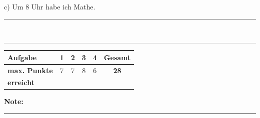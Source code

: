 \documentclass[11pt, a4paper]{article}
\newcommand{\luecke}[1]{\rule{#1}{0.4pt}}
\begin{document}
\noindent
c) Um 8 Uhr habe ich Mathe. \\[1.2em]
\luecke{10cm} \\


\vspace{20pt}
\hrule
\vspace{10pt}

\noindent
\begin{tabularx}{\textwidth}{|X|c|c|c|c||c|}
\hline
\textbf{Aufgabe} & 1 & 2 & 3 & 4 & \textbf{Gesamt} \\
\hline
\textbf{max. Punkte} & 7 & 7 & 8 & 6 & \textbf{28} \\
\hline
\textbf{erreicht} & & & & & \\[0.8em]
\hline
\end{tabularx}

\vspace{10pt}

\begin{flushright}
\textbf{Note:} \luecke{2cm}
\end{flushright}
\end{document}
